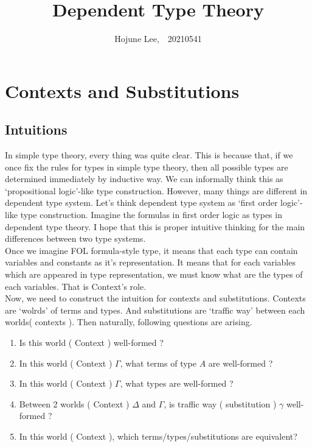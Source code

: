 \documentclass[12pt, letterpaper]{amsart}
\author[Hojune Lee]{Hojune Lee,\ \ 20210541}
\title{Dependent Type Theory}
\theoremstyle{definition}
\theoremstyle{remark}
\theoremstyle{plain}
\numberwithin{equation}{section}
\begin{document}
\maketitle


\tableofcontents

\newpage 

\section{Contexts and Substitutions}

\subsection{Intuitions}

In simple type theory, every thing was quite clear. This is because that, if we once fix the rules for types in simple type theory, 
then all possible types are determined immediately by inductive way. We can informally think this as \lq propositional logic'-like type construction. 
However, many things are different in dependent type system. Let's think dependent type system as \lq first order logic'-like type construction. 
Imagine the formulas in first order logic as types in dependent type theory. 
I hope that this is proper intuitive thinking for the main differences between two type systems. \\

Once we imagine FOL formula-style type, it means that each type can contain variables and constants as it's representation. 
It means that for each variables which are appeared in type representation, we must know what are the types of each variables.
That is Context's role. \\

Now, we need to construct the intuition for contexts and substitutions. Contexts are \lq wolrds' of terms and types. 
And substitutions are \lq traffic way' between each worlds( contexts ). Then naturally, following questions are arising. 
\begin{tcolorbox}[colback=yellow!10!white,colframe=red!75!black,title=Questions]
    \begin{enumerate}
        \item Is this world ( Context ) well-formed ?
        \item In this world ( Context ) $\Gamma$, what terms of type $A$ are well-formed ? 
        \item In this world ( Context ) $\Gamma$, what types are well-formed ? 
        \item Between 2 worlds ( Context ) $\Delta$ and $\Gamma$, is traffic way ( substitution ) $\gamma$ well-formed ?
        \item In this world ( Context ), which terms/types/substitutions are equivalent? 
    \end{enumerate}
\end{tcolorbox}
\end{document}
